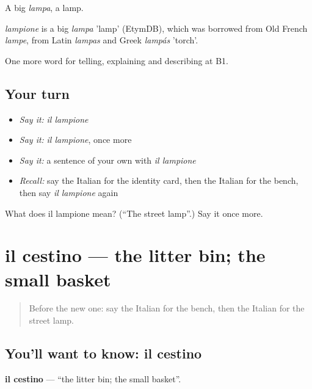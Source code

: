 A big \emph{lampa}, a lamp.

\begin{cousinweb}
\emph{lampione} is a big \emph{lampa} 'lamp' (EtymDB), which was borrowed from Old French \emph{lampe}, from Latin \emph{lampas} and Greek \emph{lampás} 'torch'.
\end{cousinweb}

\begin{grammarlens}[title={What you've built}]
One more word for telling, explaining and describing at B1.
\end{grammarlens}

\subsection*{Your turn}
\begin{itemize}
\raggedright
  \item \emph{Say it:} \emph{il lampione}
  \item \emph{Say it:} \emph{il lampione}, once more
  \item \emph{Say it:} a sentence of your own with \emph{il lampione}
  \item \emph{Recall:} say the Italian for the identity card, then the Italian for the bench, then say \emph{il lampione} again
\end{itemize}

\begin{tcolorbox}[breakable,colback=teal!4,colframe=teal!35!black,title={Before you move on}]
What does il lampione mean? (\textquotedblleft{}The street lamp\textquotedblright{}.) Say it once more.
\end{tcolorbox}
\section[il cestino]{il cestino — the litter bin; the small basket}

\label{lesson:IT-C448-cestino}



\begin{quote}
Before the new one: say the Italian for the bench, then the Italian for the street lamp.
\end{quote}

\subsection*{You'll want to know: il cestino}
\textbf{il cestino} — \textquotedblleft{}the litter bin; the small basket\textquotedblright{}.


